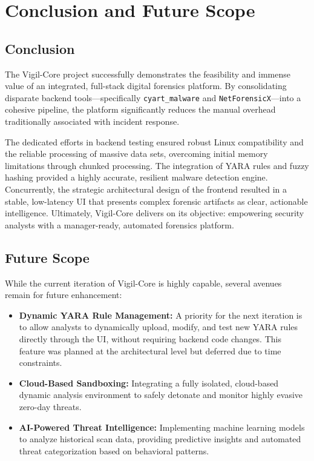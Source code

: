 \chapter{Conclusion and Future Scope}

\section{Conclusion}
The Vigil-Core project successfully demonstrates the feasibility and immense value of an integrated, full-stack digital forensics platform. By consolidating disparate backend tools—specifically \texttt{cyart\_malware} and \texttt{NetForensicX}—into a cohesive pipeline, the platform significantly reduces the manual overhead traditionally associated with incident response. 

The dedicated efforts in backend testing ensured robust Linux compatibility and the reliable processing of massive data sets, overcoming initial memory limitations through chunked processing. The integration of YARA rules and fuzzy hashing provided a highly accurate, resilient malware detection engine. Concurrently, the strategic architectural design of the frontend resulted in a stable, low-latency UI that presents complex forensic artifacts as clear, actionable intelligence. Ultimately, Vigil-Core delivers on its objective: empowering security analysts with a manager-ready, automated forensics platform.

\section{Future Scope}
While the current iteration of Vigil-Core is highly capable, several avenues remain for future enhancement:
\begin{itemize}
    \item \textbf{Dynamic YARA Rule Management:} A priority for the next iteration is to allow analysts to dynamically upload, modify, and test new YARA rules directly through the UI, without requiring backend code changes. This feature was planned at the architectural level but deferred due to time constraints.
    \item \textbf{Cloud-Based Sandboxing:} Integrating a fully isolated, cloud-based dynamic analysis environment to safely detonate and monitor highly evasive zero-day threats.
    \item \textbf{AI-Powered Threat Intelligence:} Implementing machine learning models to analyze historical scan data, providing predictive insights and automated threat categorization based on behavioral patterns.
\end{itemize}
